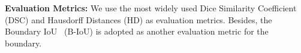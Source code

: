 \documentclass[runningheads]{llncs}
\begin{document}
\noindent\textbf{Evaluation Metrics:} 
We use the most widely used Dice Similarity Coefficient (DSC) and Hausdorff Distances (HD) as evaluation metrics. Besides, the Boundary IoU~\cite{cheng2021boundary} (B-IoU) is adopted as another evaluation metric for the boundary.


\end{document}
